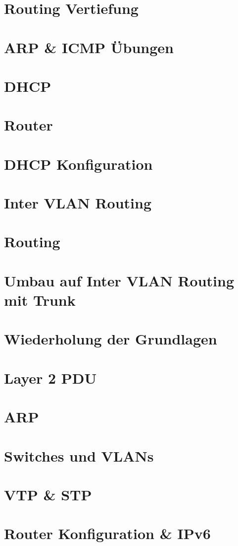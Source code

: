 \documentclass{article}
\begin{document}
	\section{Routing Vertiefung}
	\section{ARP \& ICMP Übungen}
	\section{DHCP}
	\section{Router}
	\section{DHCP Konfiguration}
	\section{Inter VLAN Routing}
	\section{Routing}
	\section{Umbau auf Inter VLAN Routing mit Trunk}
	\section{Wiederholung der Grundlagen}
	\section{Layer 2 PDU}
	\section{ARP}
	\section{Switches und VLANs}
	\section{VTP \& STP}
	\section{Router Konfiguration \& IPv6}
\end{document}
